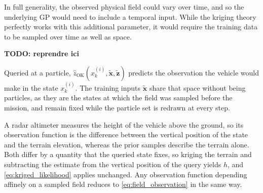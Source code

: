 \begin{remark}
	In full generality, the observed physical field could vary over time, and so the underlying GP would need to  include a temporal input. While the kriging theory perfectly works with this additional parameter, it would require the training data to be sampled over time as well as space.
\end{remark}


{\huge\textbf{TODO: reprendre ici}}

\begin{remark}\label{th:training_inputs_particles}
	Queried at a particle, $\hat{z}_{\mathrm{OK}}\left(x_k^{(i)},\tilde{\mathbf{x}},\tilde{\mathbf{z}}\right)$ predicts the observation the vehicle would make in the state $x_k^{(i)}$. The training inputs $\tilde{\mathbf{x}}$ share that space without being particles, as they are the states at which the field was sampled before the mission, and remain fixed while the particle set is redrawn at every step.
\end{remark}

\begin{remark}\label{th:altimetric_observation}
	A radar altimeter measures the height of the vehicle above the ground, so its observation function is the difference between the vertical position of the state and the terrain elevation, whereas the prior samples describe the terrain alone. Both differ by a quantity that the queried state fixes, so kriging the terrain and subtracting the estimate from the vertical position of the query yields $h$, and \eqref{eq:kriged_likelihood} applies unchanged. Any observation function depending affinely on a sampled field reduces to \eqref{eq:field_observation} in the same way.
\end{remark}

